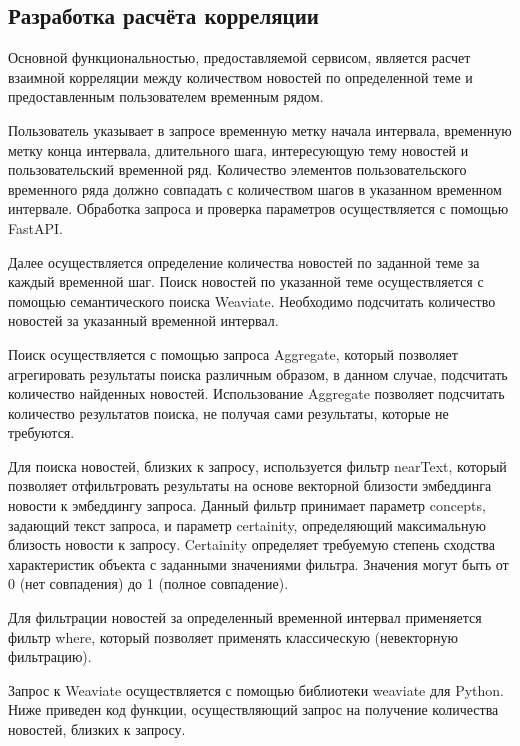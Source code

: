 \subsection{Разработка расчёта корреляции}

Основной функциональностью, предоставляемой сервисом, является расчет взаимной корреляции между количеством новостей по определенной теме и предоставленным пользователем временным рядом.

Пользователь указывает в запросе временную метку начала интервала, временную метку конца интервала, длительного шага, интересующую тему новостей и пользовательский временной ряд. Количество элементов пользовательского временного ряда должно совпадать с количеством шагов в указанном временном интервале. Обработка запроса и проверка параметров осуществляется с помощью FastAPI.

Далее осуществляется определение количества новостей по заданной теме за каждый временной шаг. Поиск новостей по указанной теме осуществляется с помощью семантического поиска Weaviate. Необходимо подсчитать количество новостей за указанный временной интервал.

Поиск осуществляется с помощью запроса Aggregate, который позволяет агрегировать результаты поиска различным образом, в данном случае, подсчитать количество найденных новостей. Использование Aggregate позволяет подсчитать количество результатов поиска, не получая сами результаты, которые не требуются.

Для поиска новостей, близких к запросу, используется фильтр nearText, который позволяет отфильтровать результаты на основе векторной близости эмбеддинга новости к эмбеддингу запроса. Данный фильтр принимает параметр concepts, задающий текст запроса, и параметр certainity, определяющий максимальную близость новости к запросу. Certainity определяет требуемую степень сходства характеристик объекта с заданными значениями фильтра. Значения могут быть от 0 (нет совпадения) до 1 (полное совпадение).

Для фильтрации новостей за определенный временной интервал применяется фильтр where, который позволяет применять классическую (невекторную фильтрацию).

Запрос к Weaviate осуществляется с помощью библиотеки weaviate для Python. Ниже приведен код функции, осуществляющий запрос на получение количества новостей, близких к запросу.

